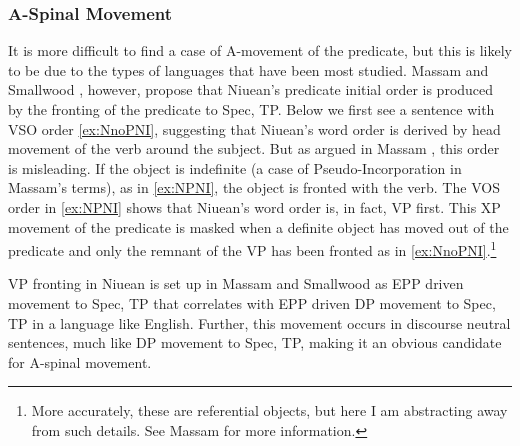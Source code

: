 \documentclass[output=paper,colorlinks,citecolor=brown,
]{langscibook}
\begin{document}
\subsubsection{A-Spinal Movement}

It is more difficult to find a case of A-movement of the predicate, but this is likely to be due to the types of languages that have been most studied.  Massam and Smallwood \citeyearpar{Massam:1997}, however, propose that Niuean's predicate initial order is produced by the fronting of the predicate to Spec, TP.  Below we first see a sentence with VSO order \ref{ex:NnoPNI}, suggesting that Niuean's word order is derived by head movement of the verb around the subject.  But as argued in Massam \citeyearpar{Massam:2001}, this order is misleading. If the object is indefinite (a case of Pseudo-Incorporation in Massam's terms), as in \ref{ex:NPNI}, the object is fronted with the verb. The VOS order in \ref{ex:NPNI} shows that Niuean's word order is, in fact, VP first.  This XP movement of the predicate is masked when a definite object has moved out of the predicate and only the remnant of the VP has been fronted as in \ref{ex:NnoPNI}.\footnote{More accurately, these are referential objects, but here I am abstracting away from such details.  See Massam \citeyearpar{Massam:2020} for more information.}


	\z
\z

VP fronting in Niuean is set up in Massam and Smallwood \citeyearpar{Massam:1997} as EPP driven movement to Spec, TP that correlates with EPP driven DP movement to Spec, TP in a language like English.  Further, this movement occurs in discourse neutral sentences, much like DP movement to Spec, TP, making it an obvious candidate for A-spinal movement. 
\end{document}
